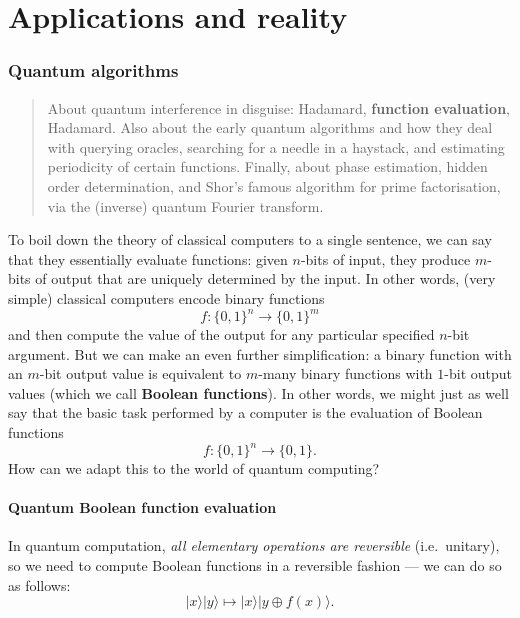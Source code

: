 \documentclass[fleqn,a4paper]{article}
\let\oldsection\section
\renewcommand\section{\clearpage\oldsection}
\let\oldpart\part
\renewcommand\part{\clearpage\oldpart}
\theoremstyle{definition}
\theoremstyle{definition}
\theoremstyle{definition}
\theoremstyle{definition}
\theoremstyle{remark}
\begin{document}
\hypertarget{part-applications-and-reality}{%
\part{Applications and reality}\label{part-applications-and-reality}}

\hypertarget{quantum-algorithms}{%
\section{Quantum algorithms}\label{quantum-algorithms}}

\begin{quote}
About quantum interference in disguise: Hadamard, \textbf{function evaluation}, Hadamard.
Also about the early quantum algorithms and how they deal with querying oracles, searching for a needle in a haystack, and estimating periodicity of certain functions.
Finally, about phase estimation, hidden order determination, and Shor's famous algorithm for prime factorisation, via the (inverse) quantum Fourier transform.
\end{quote}

To boil down the theory of classical computers to a single sentence, we can say that they essentially evaluate functions: given \(n\)-bits of input, they produce \(m\)-bits of output that are uniquely determined by the input.
In other words, (very simple) classical computers encode binary functions
\[
  f\colon \{0,1\}^n \to \{0,1\}^m
\]
and then compute the value of the output for any particular specified \(n\)-bit argument.
But we can make an even further simplification: a binary function with an \(m\)-bit output value is equivalent to \(m\)-many binary functions with \(1\)-bit output values (which we call \textbf{Boolean functions}).
In other words, we might just as well say that the basic task performed by a computer is the evaluation of Boolean functions
\[
  f\colon \{0,1\}^n \to  \{0,1\}.
\]
How can we adapt this to the world of quantum computing?

\hypertarget{quantum-boolean-function-evaluation}{%
\subsection{Quantum Boolean function evaluation}\label{quantum-boolean-function-evaluation}}

In quantum computation, \emph{all elementary operations are reversible} (i.e.~unitary), so we need to compute Boolean functions in a reversible fashion --- we can do so as follows:
\[
  |x\rangle|y\rangle \longmapsto |x\rangle|y\oplus f(x)\rangle.
\]
\end{document}

